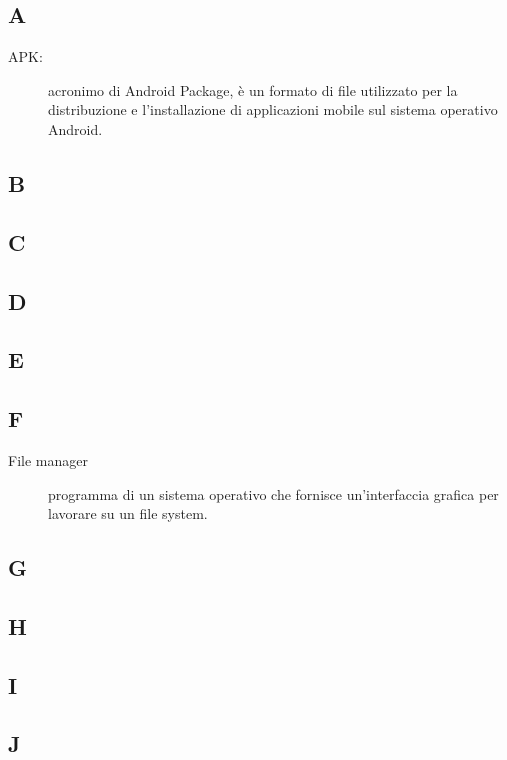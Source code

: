 \documentclass[../manuale-utente.tex]{subfiles}
\begin{document}
\subsection{A}
\begin{description}
    \item[APK:] acronimo di Android Package, è un formato di file utilizzato per la distribuzione e l'installazione di applicazioni mobile sul sistema operativo Android.
\end{description}

\subsection{B}

\subsection{C}

\subsection{D}

\subsection{E}

\subsection{F}
\begin{description}
    \item[File manager] programma di un sistema operativo che fornisce un'interfaccia grafica per lavorare su un file system.
\end{description}

\subsection{G}

\subsection{H}

\subsection{I}

\subsection{J}
\end{document}
